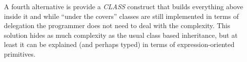 \documentclass[preprint]{sigplanconf}
\begin{document}
A fourth alternative is provide a \textit{CLASS} construct that builds everything above inside it and while ``under the covers'' classes are still implemented in terms of delegation the programmer does not need to deal with the complexity. This solution hides as much complexity as the usual class based inheritance, but at least it can be explained (and perhaps typed) in terms of expression-oriented primitives.



%
%
%
%
\end{document}
